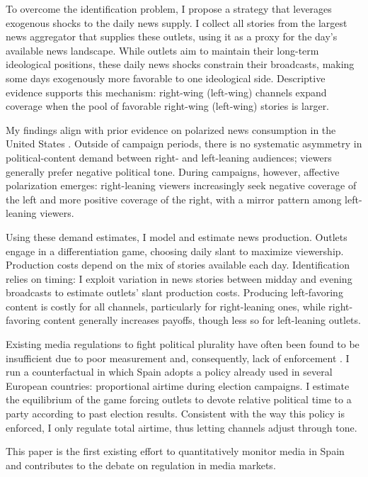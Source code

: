 \documentclass[12pt]{article}
\begin{document}
To overcome the identification problem, I propose a strategy that leverages exogenous shocks to the daily news supply. I collect all stories from the largest news aggregator that supplies these outlets, using it as a proxy for the day’s available news landscape. While outlets aim to maintain their long-term ideological positions, these daily news shocks constrain their broadcasts, making some days exogenously more favorable to one ideological side. Descriptive evidence supports this mechanism: right-wing (left-wing) channels expand coverage when the pool of favorable right-wing (left-wing) stories is larger.

My findings align with prior evidence on polarized news consumption in the United States \citep{Peterson2017Echo}. Outside of campaign periods, there is no systematic asymmetry in political-content demand between right- and left-leaning audiences; viewers generally prefer negative political tone. During campaigns, however, affective polarization emerges: right-leaning viewers increasingly seek negative coverage of the left and more positive coverage of the right, with a mirror pattern among left-leaning viewers.

Using these demand estimates, I model and estimate news production. Outlets engage in a differentiation game, choosing daily slant to maximize viewership. Production costs depend on the mix of stories available each day. Identification relies on timing: I exploit variation in news stories between midday and evening broadcasts to estimate outlets’ slant production costs. Producing left-favoring content is costly for all channels, particularly for right-leaning ones, while right-favoring content generally increases payoffs, though less so for left-leaning outlets.

Existing media regulations to fight political plurality have often been found to be insufficient due to poor measurement and, consequently, lack of enforcement \citep{cage_assemblee}. I run a counterfactual in which Spain adopts a policy already used in several European countries: proportional airtime during election campaigns. I estimate the equilibrium of the game forcing outlets to devote relative political time to a party according to past election results. Consistent with the way this policy is enforced, I only regulate total airtime, thus letting channels adjust through tone.

This paper is the first existing effort to quantitatively monitor media in Spain and contributes to the debate on regulation in media markets.
\end{document}
